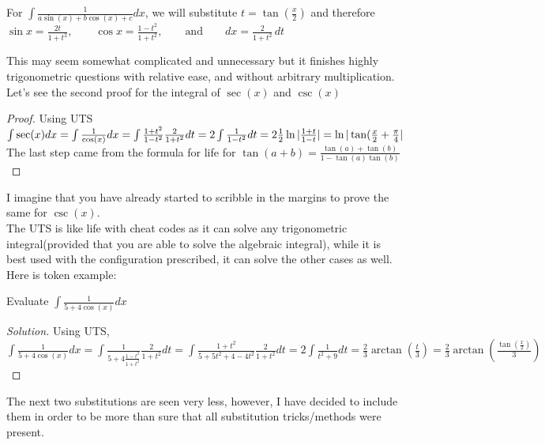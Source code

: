 \begin{theorem}
    For $\int \frac{1}{a\sin(x)+b\cos(x)+c} dx$, we will substitute $t=\tan(\frac{x}{2})$ and therefore $\sin x={\frac {2t}{1+t^{2}}},\qquad \cos x={\frac {1-t^{2}}{1+t^{2}}},\qquad {\text{and}}\qquad dx={\frac {2}{1+t^{2}}}\,dt$
\end{theorem}
This may seem somewhat complicated and unnecessary but it finishes highly trigonometric questions with relative ease, and without arbitrary multiplication. Let's see the second proof for the integral of $\sec(x)$  and $\csc(x)$\\
\begin{proof}
Using UTS
    $\int \sec(x) dx\\
    = \int \frac{1}{\cos(x)} dx\\
    = \int \frac{1+t^2}{1-t^2} \frac{2}{1+t^2} dt\\ 
    = 2\int \frac{1}{1-t^2}dt\\ 
    = 2 \frac{1}{2}\ln{|\frac{1+t}{1-t}|}\\ 
    = \ln{|\tan(\frac{x}{2}+\frac{\pi}{4}|}
    $
    The last step came from the formula for life for $\tan(a+b)=\frac{\tan(a)+\tan(b)}{1-\tan(a)\tan(b)}$
\end{proof}
I imagine that you have already started to scribble in the margins to prove the same for $\csc(x)$.\\
The UTS is like life with cheat codes as it can solve any trigonometric integral(provided that you are able to solve the algebraic integral), while it is best used with the configuration prescribed, it can solve the other cases as well.\\
Here is token example:\\
\begin{example}
    Evaluate $\int \frac{1}{5+4\cos(x)}dx$
\end{example}
\begin{proof}
    [Solution]
    Using UTS,\\
    $\int \frac{1}{5+4\cos(x)}dx
    = \int \frac{1}{5+4\frac{1-t^2}{1+t^2}} \frac{2}{1+t^2} dt
    = \int \frac{1+t^2}{5+5t^2+4-4t^2} \frac{2}{1+t^2} dt
    = 2 \int \frac{1}{t^2+9}dt
    = \frac{2}{3} \arctan(\frac{t}{3})
    = \frac{2}{3} \arctan(\frac{\tan(\frac{x}{2})}{3})
    $
\end{proof}
The next two substitutions are seen very less, however, I have decided to include them in order to be more than sure that all substitution tricks/methods were present.\\
